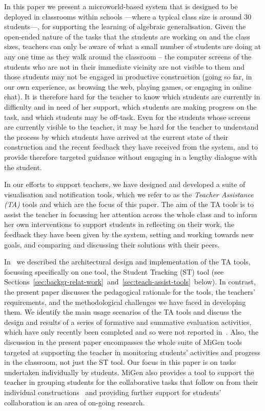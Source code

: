 In this paper we present a microworld-based system that is designed to
be deployed in classrooms within schools ---where a typical class size
is around 30 students---, for supporting the learning of algebraic
generalisation. Given the
open-ended nature of the tasks that the students are working on and
the class sizes, teachers can only be aware of what a small number of
students are doing at any one time as they walk around the classroom –
the computer screens of the students who are not in their immediate
vicinity are not visible to them and those students may not be engaged
in productive construction (going so far, in our own experience, as
browsing the web, playing games, or engaging in online chat). It is
therefore hard for the teacher to know which students are currently in
difficulty and in need of her support, which students are making
progress on the task, and which students may be off-task. Even for the
students whose screens are currently visible to the teacher, it may be
hard for the teacher to understand the process by which students have
arrived at the current state of their construction and the recent
feedback they have received from the system, and to provide therefore
targeted guidance without engaging in a lengthy dialogue with the
student.
 
In our efforts to support teachers, we have designed and developed a
suite of visualisation and notification
tools, which we refer to as the {\em Teacher Assistance (TA)} tools
and which are the focus of this paper. The aim of the TA tools is to
assist the teacher in focussing her attention across the whole class and to
inform her own interventions to support students in reflecting on
their work, the feedback they have been given by the system, setting
and working towards new goals, and comparing and discussing their
solutions with their peers. 

In~\cite{PearceLazard2010Design,IEEE-TLT-TA} we described the architectural design
and implementation of the TA tools, focussing specifically on one
tool, the Student Tracking (ST) tool (see
Sections~\ref{sec:backgr-relat-work}~and~\ref{sec:teach-assist-tools}~below). 
In contrast, the present paper discusses the pedagogical rationale for
the tools, the teachers’ requirements, and the methodological
challenges we have faced in developing them. We identify the main
usage scenarios of the TA tools and discuss the design and results of
a series of formative and summative evaluation activities, which have
only recently been completed and so were not reported
in~\cite{PearceLazard2010Design,IEEE-TLT-TA}. 
Also, the discussion in the present paper
encompasses the whole suite of MiGen tools targeted at supporting the
teacher in monitoring students’ activities and progress in the
classroom, not just the ST tool.  Our focus in this paper is on tasks
undertaken individually by students. MiGen also provides a tool to
support the teacher in grouping students for the collaborative tasks
that follow on from their individual constructions~\cite{GroupingTool}
and providing further support for
students’ collaboration is an area of on-going research.
 
